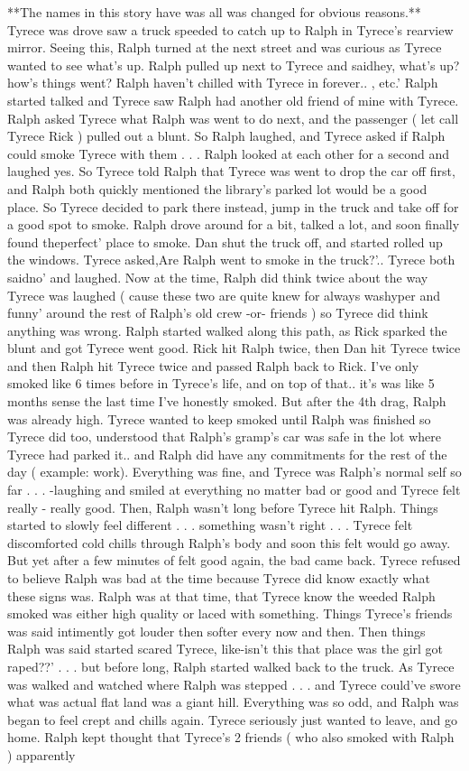 \documentclass[12pt]{book}
\begin{document}
**The names in this story have was all was changed for obvious reasons.** Tyrece was drove saw a truck speeded to catch up to Ralph in Tyrece's rearview mirror. Seeing this, Ralph turned at the next street and was curious as Tyrece wanted to see what's up. Ralph pulled up next to Tyrece and saidhey, what's up? how's things went? Ralph haven't chilled with Tyrece in forever.. , etc.' Ralph started talked and Tyrece saw Ralph had another old friend of mine with Tyrece. Ralph asked Tyrece what Ralph was went to do next, and the passenger ( let call Tyrece Rick ) pulled out a blunt. So Ralph laughed, and Tyrece asked if Ralph could smoke Tyrece with them . . .  Ralph looked at each other for a second and laughed yes. So Tyrece told Ralph that Tyrece was went to drop the car off first, and Ralph both quickly mentioned the library's parked lot would be a good place. So Tyrece decided to park there instead, jump in the truck and take off for a good spot to smoke. Ralph drove around for a bit, talked a lot, and soon finally found theperfect' place to smoke. Dan shut the truck off, and started rolled up the windows. Tyrece asked,Are Ralph went to smoke in the truck?'.. Tyrece both saidno' and laughed. Now at the time, Ralph did think twice about the way Tyrece was laughed ( cause these two are quite knew for always washyper and funny' around the rest of Ralph's old crew -or- friends ) so Tyrece did think anything was wrong. Ralph started walked along this path, as Rick sparked the blunt and got Tyrece went good. Rick hit Ralph twice, then Dan hit Tyrece twice and then Ralph hit Tyrece twice and passed Ralph back to Rick. I've only smoked like 6 times before in Tyrece's life, and on top of that.. it's was like 5 months sense the last time I've honestly smoked. But after the 4th drag, Ralph was already high. Tyrece wanted to keep smoked until Ralph was finished so Tyrece did too, understood that Ralph's gramp's car was safe in the lot where Tyrece had parked it.. and Ralph did have any commitments for the rest of the day ( example: work). Everything was fine, and Tyrece was Ralph's normal self so far . . .  -laughing and smiled at everything no matter bad or good and Tyrece felt really - really good. Then, Ralph wasn't long before Tyrece hit Ralph. Things started to slowly feel different  . . .  something wasn't right . . .  Tyrece felt discomforted cold chills through Ralph's body and soon this felt would go away. But yet after a few minutes of felt good again, the bad came back. Tyrece refused to believe Ralph was bad at the time because Tyrece did know exactly what these signs was. Ralph was at that time, that Tyrece know the weeded Ralph smoked was either high quality or laced with something. Things Tyrece's friends was said intimently got louder then softer every now and then. Then things Ralph was said started scared Tyrece, like-isn't this that place was the girl got raped??' . . .  but before long, Ralph started walked back to the truck. As Tyrece was walked and watched where Ralph was stepped  . . .  and Tyrece could've swore what was actual flat land was a giant hill. Everything was so odd, and Ralph was began to feel crept and chills again. Tyrece seriously just wanted to leave, and go home. Ralph kept thought that Tyrece's 2 friends ( who also smoked with Ralph ) apparently 
\end{document}
